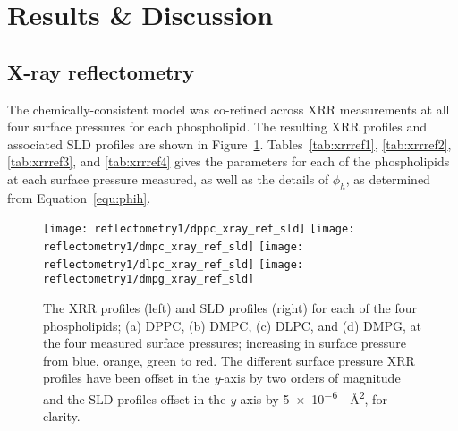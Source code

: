 \section{Results \& Discussion}
\subsection{X-ray reflectometry}
The chemically-consistent model was co-refined across XRR measurements at all four surface pressures for each phospholipid.
The resulting XRR profiles and associated SLD profiles are shown in Figure~\ref{fig:xrrref}.
Tables~\ref{tab:xrrref1}, \ref{tab:xrrref2}, \ref{tab:xrrref3}, and \ref{tab:xrrref4} gives the parameters for each of the phospholipids at each surface pressure measured, as well as the details of $\phi_h$, as determined from Equation~\ref{equ:phih}.
%
\begin{figure}
    \centering
    \texttt{[image: reflectometry1/dppc\_xray\_ref\_sld]}
    \texttt{[image: reflectometry1/dmpc\_xray\_ref\_sld]}
    \texttt{[image: reflectometry1/dlpc\_xray\_ref\_sld]}
    \texttt{[image: reflectometry1/dmpg\_xray\_ref\_sld]}
    \caption{The XRR profiles (left) and SLD profiles (right) for each of the four phospholipids; (a) DPPC, (b) DMPC, (c) DLPC, and (d) DMPG, at the four measured surface pressures; increasing in surface pressure from blue, orange, green to red. The different surface pressure XRR profiles have been offset in the \emph{y}-axis by two orders of magnitude and the SLD profiles offset in the \emph{y}-axis by \SI{5e-6}{\per\angstrom\squared}, for clarity.}
    \label{fig:xrrref}
\end{figure}
%
%
